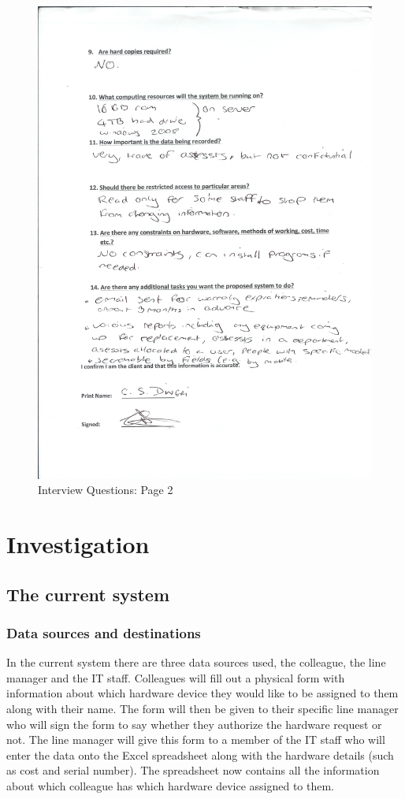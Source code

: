 \begin{figure}[H]
\includegraphics[width=.9\textwidth,height=.9\textheight,keepaspectratio]{Page2Interview.jpg}
\caption{Interview Questions: Page 2} \label{Page1Interview}
\end{figure}

\section{Investigation}

\subsection{The current system}

\subsubsection{Data sources and destinations}

In the current system there are three data sources used, the colleague, the line manager and the IT staff. Colleagues will fill out a physical form with information about which hardware device they would like to be assigned to them along with their name. The form will then be given to their specific line manager who will sign the form to say whether they authorize the hardware request or not. The line manager will give this form to a member of the IT staff who will enter the data onto the Excel spreadsheet along with the hardware details (such as cost and serial number). The spreadsheet now contains all the information about which colleague has which hardware device assigned to them.

